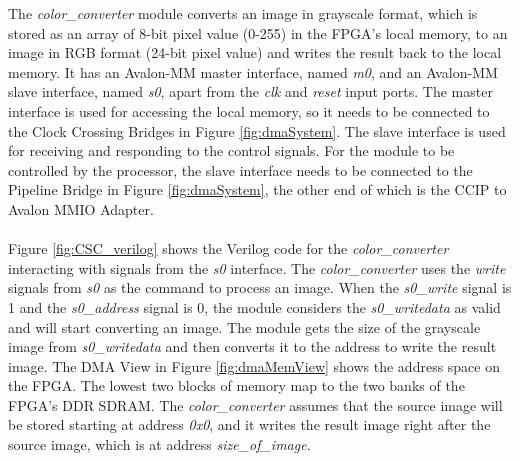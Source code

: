 \documentclass[11pt, twoside, pdftex]{article}
\begin{document}
\noindent
The {\it color\_converter} module converts an image in grayscale format, which is stored as an array of 8-bit pixel value (0-255) in the FPGA's local memory, to an image in RGB format (24-bit pixel value) and writes the result back to the local memory. It has an Avalon-MM master interface, named {\it m0}, and an Avalon-MM slave interface, named {\it s0}, apart from the {\it clk} and {\it reset} input ports. The master interface is used for accessing the local memory, so it needs to be connected to the Clock Crossing Bridges in Figure \ref{fig:dmaSystem}. The slave interface is used for receiving and responding to the control signals. For the module to be controlled by the processor, the slave interface needs to be connected to the Pipeline Bridge in Figure \ref{fig:dmaSystem}, the other end of which is the CCIP to Avalon MMIO Adapter.\\
\\
Figure \ref{fig:CSC_verilog} shows the Verilog code for the {\it color\_converter} interacting with signals from the {\it s0} interface. The {\it color\_converter} uses the {\it write} signals from {\it s0} as the command to process an image. When the {\it s0\_write} signal is 1 and the {\it s0\_address} signal is 0, the module considers the {\it s0\_writedata} as valid and will start converting an image. The module gets the size of the grayscale image from {\it s0\_writedata} and then converts it to the address to write the result image.  The DMA View in Figure \ref{fig:dmaMemView} shows the address space on the FPGA. The lowest two blocks of memory map to the two banks of the FPGA's DDR SDRAM. The {\it color\_converter} assumes that the source image will be stored starting at address {\it 0x0}, and it writes the result image right after the source image, which is at address {\it size\_of\_image}.
\end{document}
